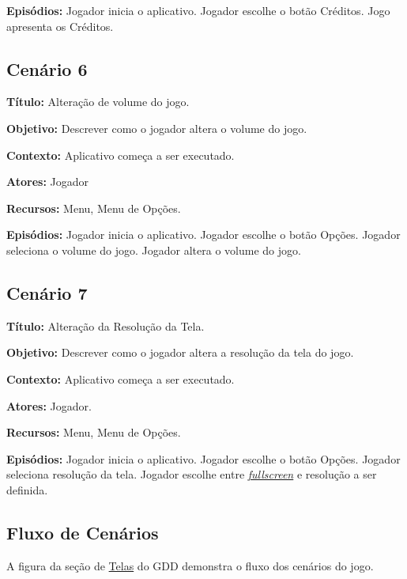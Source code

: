 \textbf{Episódios:} Jogador inicia o aplicativo. Jogador escolhe o botão Créditos. Jogo apresenta os Créditos.

\subsection{Cenário 6}

\textbf{Título:} Alteração de volume do jogo.

\textbf{Objetivo:} Descrever como o jogador altera o volume do jogo.

\textbf{Contexto:} Aplicativo começa a ser executado.

\textbf{Atores:} Jogador

\textbf{Recursos:} Menu, Menu de Opções.

\textbf{Episódios:} Jogador inicia o aplicativo. Jogador escolhe o botão Opções. Jogador seleciona o volume do jogo. Jogador altera o volume do jogo.

\subsection{Cenário 7}

\textbf{Título:} Alteração da Resolução da Tela.

\textbf{Objetivo:} Descrever como o jogador altera a resolução da tela do jogo.

\textbf{Contexto:} Aplicativo começa a ser executado.

\textbf{Atores:} Jogador.

\textbf{Recursos:} Menu, Menu de Opções.

\textbf{Episódios:} Jogador inicia o aplicativo. Jogador escolhe o botão Opções. Jogador seleciona resolução da tela. Jogador escolhe entre \hyperlink{fullscreen}{\textit{fullscreen}} e resolução a ser definida.

\subsection{Fluxo de Cenários}

A figura da seção de \hyperlink{Telas}{Telas} do GDD demonstra o fluxo dos cenários do jogo.



